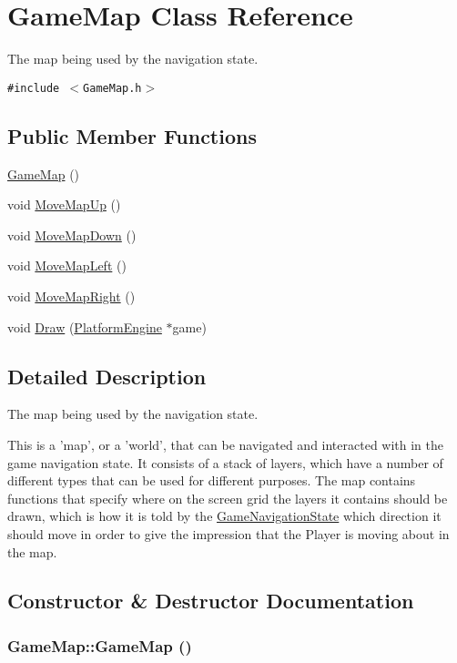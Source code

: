 \hypertarget{class_game_map}{
\section{GameMap Class Reference}
\label{class_game_map}
}
The map being used by the navigation state.  


{\tt \#include $<$GameMap.h$>$}

\subsection*{Public Member Functions}
\begin{CompactItemize}
\item 
\hyperlink{class_game_map_ae71e5694cf19612fcaa4c1e21b03b71}{GameMap} ()
\item 
void \hyperlink{class_game_map_e9b33ef01ca643a2389e7be0ebf838b1}{MoveMapUp} ()
\item 
void \hyperlink{class_game_map_7466202e8f2bd3ae188ddcbd7e50a023}{MoveMapDown} ()
\item 
void \hyperlink{class_game_map_90fe97ecdcee40995d8e5fa86857cf5c}{MoveMapLeft} ()
\item 
void \hyperlink{class_game_map_e76fd062e8e47331e7e999dbea0f0486}{MoveMapRight} ()
\item 
void \hyperlink{class_game_map_c289ffedd32b98d2827e6b765b3e50d6}{Draw} (\hyperlink{class_platform_engine}{PlatformEngine} $\ast$game)
\end{CompactItemize}


\subsection{Detailed Description}
The map being used by the navigation state. 

This is a 'map', or a 'world', that can be navigated and interacted with in the game navigation state. It consists of a stack of layers, which have a number of different types that can be used for different purposes. The map contains functions that specify where on the screen grid the layers it contains should be drawn, which is how it is told by the \hyperlink{class_game_navigation_state}{GameNavigationState} which direction it should move in order to give the impression that the Player is moving about in the map. 

\subsection{Constructor \& Destructor Documentation}
\hypertarget{class_game_map_ae71e5694cf19612fcaa4c1e21b03b71}{
\subsubsection[{GameMap}]{\setlength{\rightskip}{0pt plus 5cm}GameMap::GameMap ()}}
\label{class_game_map_ae71e5694cf19612fcaa4c1e21b03b71}




